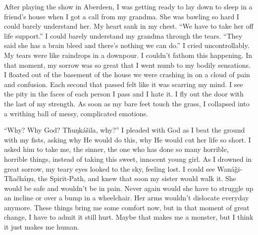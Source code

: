 \documentclass[12pt, letterpaper]{article}
\begin{document}
\begin{flushleft}
After playing the show in Aberdeen,
I was getting ready to lay down to sleep in a friend's house
when I got a call from my grandma.
She was bawling so hard I could barely understand her.
My heart sank in my chest.
``We have to take her off life support.\@''
I could barely understand my grandma through the tears.
``They said she has a brain bleed and there's nothing we can do.\@''
I cried uncontrollably.
My tears were like raindrops in a downpour.
I couldn’t fathom this happening.
In that moment, my sorrow was so great
that I went numb to my bodily sensations.
I floated out of the basement of the house
we were crashing in on a cloud of pain and confusion.
Each second that passed felt like it was scarring my mind.
I see the pity in the faces of each person I pass and I hate it.
I fly out the door with the last of my strength. 
As soon as my bare feet touch the grass,
I collapsed into a writhing ball of messy, complicated emotions.
\vspace{5mm}

``Why? Why God? Tȟuŋkášila, why?\@''
I pleaded with God as I beat the ground with my fists,
asking why He would do this, why He would cut her life so short.
I asked him to take me, the sinner, the one who has done so many horrible,
horrible things, instead of taking this sweet, innocent young girl.
As I drowned in great sorrow, 
my teary eyes looked to the sky, feeling lost.
I could see Wanáǧi-Tȟačháŋu, the Spirit-Path,
and knew that soon my sister would walk it.
She would be safe and wouldn't be in pain.
Never again would she have to struggle up an
incline or over a bump in a wheelchair.
Her arms wouldn't dislocate everyday anymore.
These things bring me some comfort now, 
but in that moment of great change,
I have to admit it still hurt. 
Maybe that makes me a monster,
but I think it just makes me human.
\vspace{5mm}






\end{flushleft}
\end{document}
